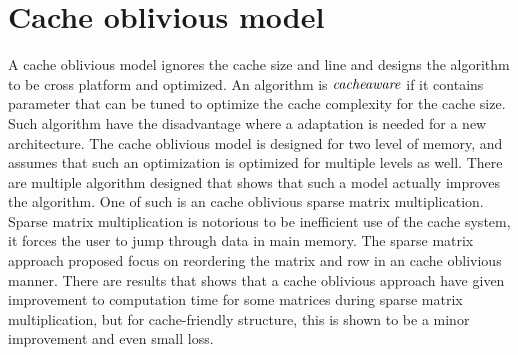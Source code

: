 \section{Cache oblivious model} 
A cache oblivious model ignores the cache size and line and designs the algorithm to be cross platform and optimized. An algorithm is $\it{cache aware}$ if it contains parameter that can be tuned to optimize the cache complexity for the cache size\cite{CacheObli1999}. Such algorithm have the disadvantage where a adaptation is needed for a new architecture\cite{COmultiplic2009}. The cache oblivious model is designed for two level of memory, and assumes that such an optimization is optimized for multiple levels as well. There are multiple algorithm designed that shows that such a model actually improves the algorithm. One of such is an cache oblivious sparse matrix multiplication. Sparse matrix multiplication is notorious to be inefficient use of the cache system, it forces the user to jump through data in main memory\cite{COmuliplic2009}. The sparse matrix approach proposed \cite{COmultiplic2009} focus on reordering the matrix and row in an cache oblivious manner. There are results that shows that a cache oblivious approach have given improvement to computation time for some matrices during sparse matrix multiplication, but for cache-friendly structure, this is shown to be a minor improvement and even small loss. 